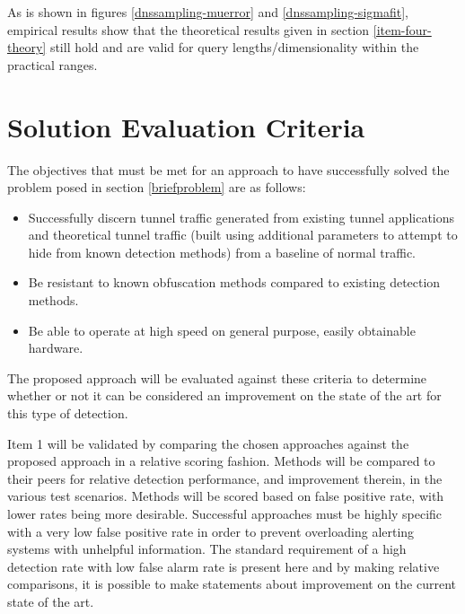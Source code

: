 \documentclass[12pt]{report}
\theoremstyle{remark}
\theoremstyle{definition}
\theoremstyle{definition}
\theoremstyle{definition}
\begin{document}
As is shown in figures \ref{dnssampling-muerror} and \ref{dnssampling-sigmafit}, empirical results show that the theoretical results given in section
\ref{item-four-theory} still hold and are valid for query lengths/dimensionality
within the practical ranges.

\clearpage
\section{Solution Evaluation Criteria}

The objectives that must be met for an
approach to have successfully solved the problem posed in section
\ref{briefproblem} are as follows:

\label{methodreqs}
\begin{itemize}
\item Successfully discern tunnel traffic generated from
existing tunnel applications and theoretical tunnel traffic (built using
additional parameters to attempt to hide from known detection methods) from a
baseline of normal traffic.
\item Be resistant to known obfuscation methods compared to existing detection methods.
\item Be able to operate at high speed on general purpose, easily obtainable
hardware.
\end{itemize}

The proposed approach will be evaluated against these criteria to determine
whether or not it can be considered an improvement on the state of the art for
this type of detection. 


Item 1 will be validated by comparing the chosen approaches against the proposed
approach in a relative scoring fashion. Methods will be compared to their peers
for relative detection performance, and improvement therein, in the various test
scenarios. Methods will be scored based on false positive rate, with lower rates
being more desirable. Successful approaches must be highly specific with a very
low false positive rate in order to prevent overloading alerting systems with
unhelpful information. The standard requirement of a high detection rate with
low false alarm rate is present here and by making relative comparisons, it is
possible to make statements about improvement on the current state of the art.
\end{document}
